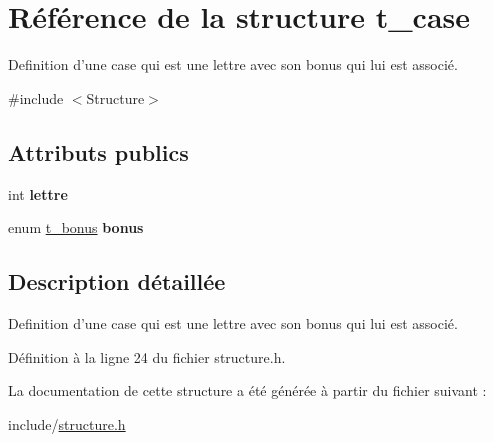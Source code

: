 \hypertarget{structt__case}{\section{Référence de la structure t\-\_\-case}
\label{structt__case}
}


Definition d'une case qui est une lettre avec son bonus qui lui est associé.  




{\ttfamily \#include $<$Structure$>$}

\subsection*{Attributs publics}
\begin{DoxyCompactItemize}
\item 
\hypertarget{structt__case_a38245c7046b2e01295c369509a87ab1b}{int {\bfseries lettre}}\label{structt__case_a38245c7046b2e01295c369509a87ab1b}

\item 
\hypertarget{structt__case_a5648b98d34144d64dfc9ff8397159db5}{enum \hyperlink{structure_8h_a4dfb649c60c07e69175f04af6e69d33e}{t\-\_\-bonus} {\bfseries bonus}}\label{structt__case_a5648b98d34144d64dfc9ff8397159db5}

\end{DoxyCompactItemize}


\subsection{Description détaillée}
Definition d'une case qui est une lettre avec son bonus qui lui est associé. 

Définition à la ligne 24 du fichier structure.\-h.



La documentation de cette structure a été générée à partir du fichier suivant \-:\begin{DoxyCompactItemize}
\item 
include/\hyperlink{structure_8h}{structure.\-h}\end{DoxyCompactItemize}
